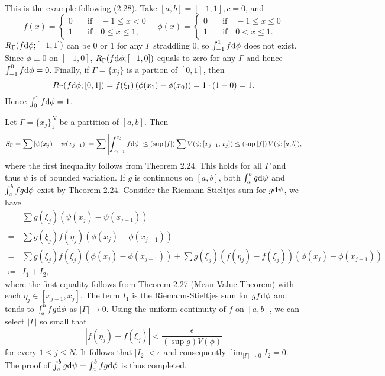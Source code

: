 
\begin{exercise}{2.14}
  This is the example following (2.28).
  Take $[a,b] = [-1, 1], c=0$, and
  \[
    f(x) = \left\{
    \begin{aligned}
      0 & \quad \text{if} \quad -1 \le x < 0 \\
      1 & \quad \text{if} \quad 0 \le x \le 1,
    \end{aligned}
    \right.
    \quad
    \phi(x) = \left\{
    \begin{aligned}
      0 & \quad \text{if} \quad -1 \le x \le 0 \\
      1 & \quad \text{if} \quad 0 < x \le 1.
    \end{aligned}
    \right.
  \]
  $R_\Gamma(f\mathrm{d} \phi; [-1, 1])$ can be 0 or 1 for any $\Gamma$ straddling $0$,
  so $\int_{-1}^1 f\mathrm{d} \phi$ does not exist.
  Since $\phi \equiv 0$ on $[-1, 0]$,
  $R_\Gamma(f \mathrm{d} \phi; [-1, 0])$ equals to zero for any $\Gamma$
  and hence $\int_{-1}^0 f \mathrm{d} \phi = 0$.
  Finally, if $\Gamma = \{x_j\}$ is a partion of $[0, 1]$, then
  \[
    R_\Gamma(f \mathrm{d} \phi; [0, 1]) = f(\xi_1) \left( \phi(x_1) - \phi(x_0) \right)
    = 1 \cdot (1-0) = 1.
  \]
  Hence $\int_0^1 f \mathrm{d} \phi = 1$.
\end{exercise}

\begin{exercise}{2.15}
  Let $\Gamma = \{x_j\}_1^N$ be a partition of $[a,b]$. Then
  \[
    S_\Gamma = \sum \left\vert \psi(x_j) - \psi(x_{j-1}) \right\vert
    = \sum \left\vert \int_{x_{j-1}}^{x_j} f \mathrm{d} \phi \right\vert
    \le \left(\sup |f|\right) \sum V(\phi; [x_{j-1}, x_j])
    \le \left(\sup |f|\right) V(\phi; [a,b]),
  \]
  where the first inequality follows from Theorem 2.24.
  This holds for all $\Gamma$ and thus $\psi$ is of bounded variation.
  If $g$ is continuous on $[a,b]$,
  both $\int_a^b g \mathrm{d} \psi$ and $\int_a^b fg \mathrm{d} \phi$ exist
  by Theorem 2.24.
  Consider the Riemann-Stieltjes sum for $g \mathrm{d} \psi$, we have
  \begin{align*}
    & \sum g(\xi_j) \left( \psi(x_j) - \psi(x_{j-1}) \right) \\
    = & \sum g(\xi_j) f(\eta_j) \left( \phi(x_j) - \phi(x_{j-1}) \right) \\
    = & \sum g(\xi_j) f(\xi_j) \left( \phi(x_j) - \phi(x_{j-1}) \right)
    + \sum g(\xi_j) \left( f(\eta_j) - f(\xi_j) \right)
    \left( \phi(x_j) - \phi(x_{j-1}) \right) \\
    \coloneqq & I_1 + I_2,
  \end{align*}
  where the first equality follows from Theorem 2.27 (Mean-Value Theorem)
  with each $\eta_j \in [x_{j-1}, x_j]$.
  The term $I_1$ is the Riemann-Stieltjes sum for $gf \mathrm{d} \phi$
  and tends to $\int_a^b fg \mathrm{d} \phi$ as $|\Gamma| \rightarrow 0$.
  Using the uniform continuity of $f$ on $[a,b]$,
  we can select $|\Gamma|$ so small that
  \[
    \left\vert f(\eta_j) - f(\xi_j) \right\vert <
    \frac{\epsilon} {\left( \sup g \right) V(\phi)}
  \]
  for every $1 \le j \le N$.
  It follows that $|I_2| < \epsilon$
  and consequently $\lim_{|\Gamma| \rightarrow 0} I_2 = 0$.
  The proof of $\int_a^b g \mathrm{d} \psi = \int_a^b fg \mathrm{d} \phi$ is thus completed.

\end{exercise}

